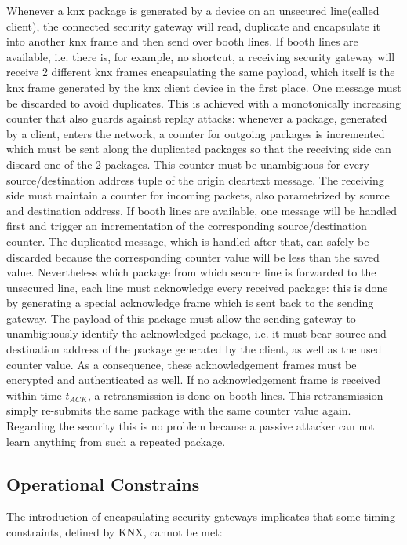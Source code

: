 Whenever a knx package is
generated by a device on an unsecured line(called client), the connected security gateway will read, duplicate and encapsulate it into another knx frame 
and then send over booth lines. If booth lines are available, i.e. there is, for example, no shortcut, a receiving security gateway will receive 2
different knx frames encapsulating the same
payload, which itself is the knx frame generated by the knx client device in the first place. One message must be discarded to avoid duplicates. This is 
achieved with a monotonically increasing counter that also guards against replay attacks: whenever a package, generated by a client, enters the
network, a counter for outgoing packages is incremented
which must be sent along the duplicated packages so that the receiving side can discard one of the 2 packages. This counter must be
unambiguous for every source/destination address tuple of the origin cleartext message. The receiving side must maintain a counter for incoming packets, 
also parametrized by source and destination address. If booth lines are available, one message will be handled first and trigger an incrementation of the
corresponding source/destination counter. The duplicated message, which is handled after that, can safely be discarded because the corresponding counter
value will be less than the saved value. Nevertheless which package from which secure line is forwarded to the unsecured line, each line must acknowledge
every received package: this is done by generating a special acknowledge frame which is sent back to the sending gateway. The payload of this package must
allow the sending gateway to unambiguously identify the acknowledged package, i.e. it must bear source and destination address of the package generated
by the client, as well as the used counter value. As a consequence, these acknowledgement frames must be encrypted and authenticated as well.
If no acknowledgement frame is received within time $t_{ACK}$, a retransmission is done on booth lines. This retransmission simply re-submits the same
package with the same counter value again. Regarding the security this is no problem because a passive attacker can not learn anything from such a repeated
package.


\subsection{Operational Constrains}

The introduction of encapsulating security gateways implicates that some timing constraints, defined by KNX, cannot be met:

